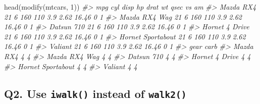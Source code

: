 \documentclass[
]{book}
\newenvironment{Shaded}{\begin{snugshade}}{\end{snugshade}}
\newcommand{\CommentTok}[1]{\textcolor[rgb]{0.56,0.35,0.01}{\textit{#1}}}
\newcommand{\DecValTok}[1]{\textcolor[rgb]{0.00,0.00,0.81}{#1}}
\newcommand{\FunctionTok}[1]{\textcolor[rgb]{0.00,0.00,0.00}{#1}}
\newcommand{\NormalTok}[1]{#1}
\begin{document}
\begin{Shaded}
\begin{Highlighting}[]
\FunctionTok{head}\NormalTok{(}\FunctionTok{modify}\NormalTok{(mtcars, }\DecValTok{1}\NormalTok{))}
\CommentTok{\#\textgreater{}                   mpg cyl disp  hp drat   wt  qsec vs am}
\CommentTok{\#\textgreater{} Mazda RX4          21   6  160 110  3.9 2.62 16.46  0  1}
\CommentTok{\#\textgreater{} Mazda RX4 Wag      21   6  160 110  3.9 2.62 16.46  0  1}
\CommentTok{\#\textgreater{} Datsun 710         21   6  160 110  3.9 2.62 16.46  0  1}
\CommentTok{\#\textgreater{} Hornet 4 Drive     21   6  160 110  3.9 2.62 16.46  0  1}
\CommentTok{\#\textgreater{} Hornet Sportabout  21   6  160 110  3.9 2.62 16.46  0  1}
\CommentTok{\#\textgreater{} Valiant            21   6  160 110  3.9 2.62 16.46  0  1}
\CommentTok{\#\textgreater{}                   gear carb}
\CommentTok{\#\textgreater{} Mazda RX4            4    4}
\CommentTok{\#\textgreater{} Mazda RX4 Wag        4    4}
\CommentTok{\#\textgreater{} Datsun 710           4    4}
\CommentTok{\#\textgreater{} Hornet 4 Drive       4    4}
\CommentTok{\#\textgreater{} Hornet Sportabout    4    4}
\CommentTok{\#\textgreater{} Valiant              4    4}
\end{Highlighting}
\end{Shaded}

\hypertarget{q2.-use-iwalk-instead-of-walk2}{%
\subsection*{\texorpdfstring{Q2. Use \texttt{iwalk()} instead of \texttt{walk2()}}{Q2. Use iwalk() instead of walk2()}}\label{q2.-use-iwalk-instead-of-walk2}}
\end{document}
